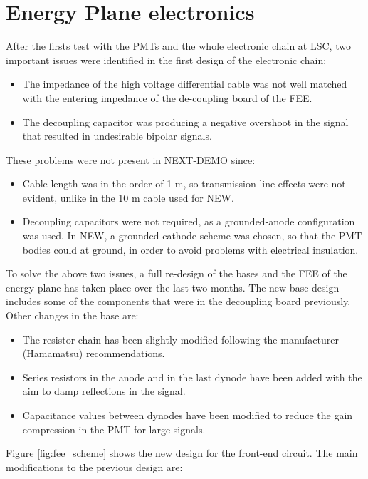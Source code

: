 \section{Energy Plane electronics}\label{sec:energy_fee}
After the firsts test with the PMTs and the whole electronic chain at LSC, two important issues were identified in the first design of the electronic chain: 
\begin{itemize}
\item The impedance of the high voltage differential cable was not well matched with the entering impedance of the de-coupling board of the FEE.
\item The decoupling capacitor was producing a negative overshoot in the signal that resulted in undesirable bipolar signals. 
\end{itemize}

These problems were not present in NEXT-DEMO since:
\begin{itemize}
\item Cable length was in the order of 1 m, so transmission line effects were not evident, unlike in the 10 m cable used for NEW.
\item Decoupling capacitors were not required, as a grounded-anode configuration was used. In NEW, a grounded-cathode scheme was chosen, so that the PMT bodies could at ground, in order to avoid problems with electrical insulation. 
\end{itemize}

To solve the above two issues, a full re-design of the bases and the FEE of the energy plane has taken place over the last two months. 
The new base design includes some of the components that were in the decoupling board previously. Other changes in the base are:

\begin{itemize}
\item The resistor chain has been slightly modified following the manufacturer (Hamamatsu) recommendations. 
\item Series resistors in the anode and in the last dynode have been added with the aim to damp reflections in the signal.
\item Capacitance values between dynodes have been modified to reduce the gain compression in the PMT for large signals.
\end{itemize}

Figure \ref{fig:fee_scheme} shows the new design for the front-end circuit. The main modifications to the previous design are:


